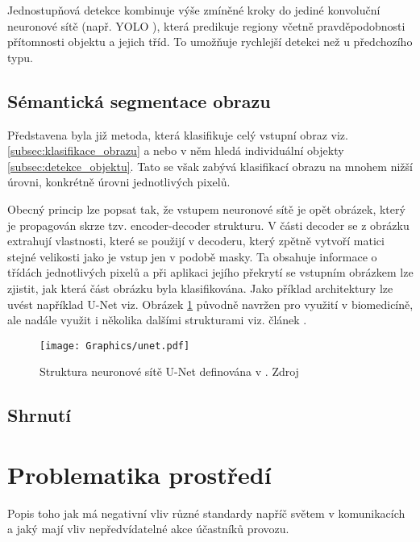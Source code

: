 \documentclass[czech, bc, kky, he, iso690alph]{fasthesis}
\begin{document}
           		Jednostupňová detekce kombinuje výše zmíněné kroky do jediné konvoluční neuronové sítě (např. YOLO \cite{YOLO}), která predikuje regiony včetně pravděpodobnosti přítomnosti objektu a jejich tříd. To umožňuje rychlejší detekci než u předchozího typu.
           	
           	\subsection{Sémantická segmentace obrazu}
            	Představena byla již metoda, která klasifikuje celý vstupní obraz viz. \ref{subsec:klasifikace_obrazu} a nebo v něm hledá individuální objekty \ref{subsec:detekce_objektu}. Tato se však zabývá klasifikací obrazu na mnohem nižší úrovni, konkrétně úrovni jednotlivých pixelů.
            	
            	Obecný princip lze popsat tak, že vstupem neuronové sítě je opět obrázek, který je propagován skrze tzv. encoder-decoder strukturu. V části decoder se z obrázku extrahují vlastnosti, které se použijí v decoderu, který zpětně vytvoří matici stejné velikosti jako je vstup jen v podobě masky. Ta obsahuje informace o třídách jednotlivých pixelů a při aplikaci jejího překrytí se vstupním obrázkem lze zjistit, jak která část obrázku byla klasifikována. Jako příklad architektury lze uvést například U-Net \cite{U-Net} viz. Obrázek \ref{pic:unet} původně navržen pro využití v biomedicíně, ale nadále využit i několika dalšími strukturami viz. článek \cite{semantic_segmentation_survey}.
            	
	            	\begin{figure}[h]
	            		\centering
	            		\texttt{[image: Graphics/unet.pdf]}
	            		\caption{Struktura neuronové sítě U-Net definována v \cite{U-Net}. Zdroj \cite{U-Net}}
	            		\label{pic:unet}
	            	\end{figure}
            	
            \subsection{Shrnutí}
            	
            
    	\section{Problematika prostředí}
    		Popis toho jak má negativní vliv různé standardy napříč světem v komunikacích a jaký mají vliv nepředvídatelné akce účastníků provozu.
\end{document}
